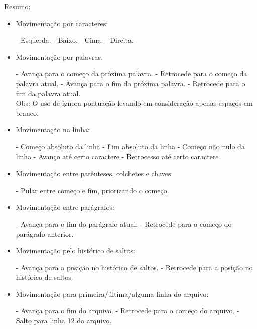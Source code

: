 \documentclass[a4paper, 12pt]{article}
\begin{document}
Resumo:
\begin{itemize}
    \item Movimentação por caracteres:

        \subitem {} - Esquerda.
        \subitem {} - Baixo.
        \subitem {} - Cima.
        \subitem {} - Direita.

    \item Movimentação por palavras:

        \subitem {}  - Avança para o começo da próxima palavra.
        \subitem {}  - Retrocede para o começo da palavra atual.
        \subitem {} - Avança para o fim da próxima palavra.
        \subitem {} - Retrocede para o fim da palavra atual.\\
        Obs: O uso de  ignora pontuação levando em consideração apenas espaços em branco.

    \item Movimentação na linha:

        \subitem {} - Começo absoluto da linha
        \subitem \vimcommand{\$} - Fim absoluto da linha
        \subitem \vimcommand{\^} - Começo não nulo da linha
        \subitem {} - Avanço até certo caractere
        \subitem {} - Retrocesso até certo caractere

    \item Movimentação entre parênteses, colchetes e chaves:

        \subitem \vimcommand{\%} - Pular entre começo e fim, priorizando o começo.

    \item Movimentação entre parágrafos:

        \subitem \vimcommand{\}} - Avança para o fim do parágrafo atual.
        \subitem \vimcommand{\{} - Retrocede para o começo do parágrafo anterior.

    \item Movimentação pelo histórico de saltos:

        \subitem {} - Avança para a posição no histórico de saltos.
        \subitem {} - Retrocede para a posição no histórico de saltos.

    \item Movimentação para primeira/última/alguma linha do arquivo:

        \subitem {} - Avança para o fim do arquivo.
        \subitem {} - Retrocede para o começo do arquivo.
        \subitem {} - Salto para linha 12 do arquivo.

\end{itemize}
    
\end{document}
